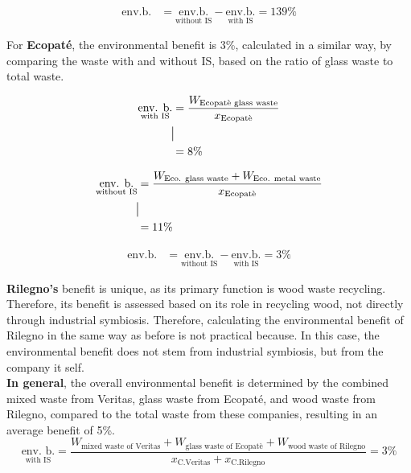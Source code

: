 \begin{align*}
\text{env.b.} &= \underset{\text{without IS}}{\text{env.b.}} - \underset{\text{with IS}}{\text{env.b.}}= 139\%
\end{align*}

\noindent For \textbf{Ecopaté}, the environmental benefit is 3\%, calculated in a similar way, by comparing the waste with and without IS, based on the ratio of glass waste to total waste.

\begin{center}
\begin{minipage}{0.48\textwidth}
\begin{align*}
\underset{\text{with IS}}{\text{env. b.}} &= \frac{W_{\text{Ecopatè glass waste}}}{x_{\text{Ecopatè}}} \\
&\rule[-1ex]{0.5pt}{3ex} \\ 
&= 8\%
\end{align*}
\end{minipage}
\hfill %
\begin{minipage}{0.48\textwidth}
\begin{align*}
\underset{\text{without IS}}{\text{env. b.}} &= \frac{W_{\text{Eco. glass waste}} + W_{\text{Eco. metal waste}}}{x_{\text{Ecopatè}}} \\
&\rule[-1ex]{0.5pt}{3ex} \\ 
&= 11\%
\end{align*}
\end{minipage}
\end{center}

\begin{align*}
\text{env.b.} &= \underset{\text{without IS}}{\text{env.b.}} - \underset{\text{with IS}}{\text{env.b.}} = 3\%
\end{align*}

\noindent \textbf{Rilegno's} benefit is unique, as its primary function is wood waste recycling. Therefore, its benefit is assessed based on its role in recycling wood, not directly through industrial symbiosis. Therefore, calculating the environmental benefit of Rilegno in the same way as before is not practical because. In this case, the environmental benefit does not stem from industrial symbiosis, but from the company it self.\\

\noindent \textbf{In general}, the overall environmental benefit is determined by the combined mixed waste from Veritas, glass waste from Ecopaté, and wood waste from Rilegno, compared to the total waste from these companies, resulting in an average benefit of 5\%.
\begin{equation*}
    \underset{\text{with IS}}{\text{env. b.}} = \frac{W_{\text{mixed waste of Veritas}} + W_{\text{glass waste of Ecopatè}} + W_{\text{wood waste of Rilegno}}}{x_{\text{C.Veritas}} + x_{\text{C.Rilegno}}} = 3\%
\end{equation*}

